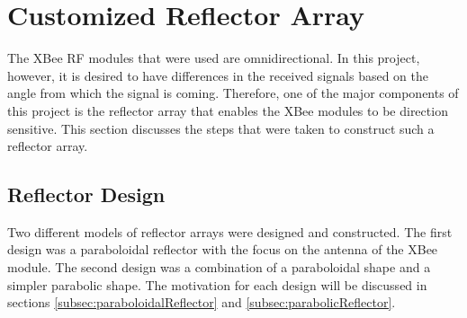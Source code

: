 \chapter{Customized Reflector Array}
\label{ch: Chapter3}

The XBee RF modules that were used are omnidirectional. In this project, however, it is desired to have differences in the received signals based on the angle from which the signal is coming. Therefore, one of the major components of this project is the reflector array that enables the XBee modules to be direction sensitive. This section discusses the steps that were taken to construct such a reflector array.

\section{Reflector Design}
Two different models of reflector arrays were designed and constructed. The first design was a paraboloidal reflector with the focus on the antenna of the XBee module. The second design was a combination of a paraboloidal shape and a simpler parabolic shape. The motivation for each design will be discussed in sections \ref{subsec:paraboloidalReflector} and \ref{subsec:parabolicReflector}.

